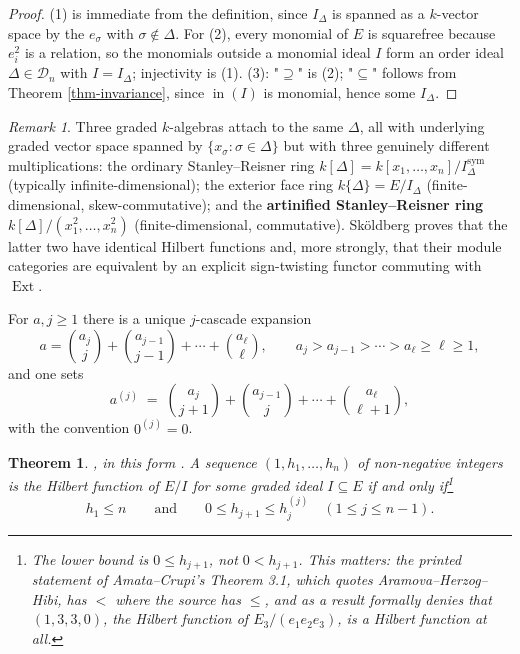 \documentclass[11pt, a4paper, abstract=yes]{scrartcl}
\theoremstyle{definition}
\theoremstyle{remark}
\newtheorem{remark}[definition]{Remark}
\theoremstyle{plain}
\newtheorem{theorem}[definition]{Theorem}
\newcommand{\inn}{\operatorname{in}}
\begin{document}
\begin{proof}
(1) is immediate from the definition, since \(I_\Delta\) is spanned as a \(k\)-vector space by the
\(e_\sigma\) with \(\sigma\notin\Delta\). For (2), every monomial of \(E\) is squarefree because \(e_i^2\) is a relation, so the monomials outside a monomial ideal \(I\) form an order ideal
\(\Delta\in\mathcal D_n\) with \(I=I_\Delta\); injectivity is (1). (3): "\(\supseteq\)" is (2);
"\(\subseteq\)" follows from Theorem \ref{thm-invariance}, since \(\inn(I)\) is monomial, hence some
\(I_\Delta\).
\end{proof}

\begin{remark}
Three graded \(k\)-algebras attach to the same \(\Delta\), all with underlying graded vector space
spanned by \(\lbrace x_\sigma:\sigma\in\Delta\rbrace\) but with three genuinely different
multiplications: the ordinary Stanley--Reisner ring
\(k[\Delta]=k[x_1,\dots,x_n]/I^{\mathrm{sym}}_\Delta\) (typically infinite-dimensional); the exterior
face ring \(k\lbrace\Delta\rbrace=E/I_\Delta\) (finite-dimensional, skew-commutative); and the
\textbf{artinified Stanley--Reisner ring} \(k[\Delta]/(x_1^2,\dots,x_n^2)\) (finite-dimensional,
commutative). Sköldberg \autocite{Skoldberg1999} proves that the latter two have identical Hilbert functions and, more
strongly, that their module categories are equivalent by an explicit sign-twisting functor commuting
with \(\operatorname{Ext}\).
\label{rem-three-rings}
\end{remark}

For \(a,j\ge1\) there is a unique \(j\)-cascade expansion
\begin{equation}\label{eq:three-rings}
  a=\binom{a_j}{j}+\binom{a_{j-1}}{j-1}+\cdots+\binom{a_\ell}{\ell},
  \qquad a_j>a_{j-1}>\cdots>a_\ell\ge\ell\ge1,
\end{equation}
and one sets
\begin{equation}\label{eq:three-rings-2}
  a^{(j)}\;=\;\binom{a_j}{j+1}+\binom{a_{j-1}}{j}+\cdots+\binom{a_\ell}{\ell+1},
\end{equation}
with the convention \(0^{(j)}=0\).

\begin{theorem}
\autocite{Kruskal1963,Katona1968,ClementsLindstroem1969}, in this form
\textcite[Theorem 4.1]{AramovaHerzogHibi1997}. A sequence \((1,h_1,\dots,h_n)\) of non-negative integers is the Hilbert function of
\(E/I\) for some graded ideal \(I\subseteq E\) if and only if\footnote{The lower bound is \(0\le h_{j+1}\), not \(0<h_{j+1}\). This matters: the printed statement of Amata--Crupi's Theorem 3.1, which quotes Aramova--Herzog--Hibi, has \(<\) where the source has \(\le\), and as a result formally denies that \((1,3,3,0)\), the Hilbert function of \(E_3/(e_1e_2e_3)\), is a Hilbert function at all.}
\begin{equation}\label{eq:kk}
  h_1\le n \qquad\text{and}\qquad 0\le h_{j+1}\le h_j^{(j)}\quad (1\le j\le n-1).
\end{equation}
\label{thm-kk}
\end{theorem}
\end{document}
